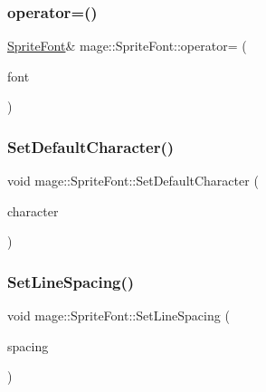 \hypertarget{classmage_1_1_sprite_font_ab00b7f5c2740faf52ea778d94ae704bd}{}\label{classmage_1_1_sprite_font_ab00b7f5c2740faf52ea778d94ae704bd} 
\subsubsection{\texorpdfstring{operator=()}{operator=()}\hspace{0.1cm}{\footnotesize\ttfamily [2/2]}}
{\footnotesize\ttfamily \hyperlink{classmage_1_1_sprite_font}{Sprite\+Font}\& mage\+::\+Sprite\+Font\+::operator= (\begin{DoxyParamCaption}\item[{\hyperlink{classmage_1_1_sprite_font}{Sprite\+Font} \&\&}]{font }\end{DoxyParamCaption})\hspace{0.3cm}{\ttfamily [delete]}}

\hypertarget{classmage_1_1_sprite_font_a0b0feb25673d6f9d9e3215167800d817}{}\label{classmage_1_1_sprite_font_a0b0feb25673d6f9d9e3215167800d817} 
\subsubsection{\texorpdfstring{Set\+Default\+Character()}{SetDefaultCharacter()}}
{\footnotesize\ttfamily void mage\+::\+Sprite\+Font\+::\+Set\+Default\+Character (\begin{DoxyParamCaption}\item[{wchar\+\_\+t}]{character }\end{DoxyParamCaption})}

\hypertarget{classmage_1_1_sprite_font_adc013412c3b59e40c326552b77d9c457}{}\label{classmage_1_1_sprite_font_adc013412c3b59e40c326552b77d9c457} 
\subsubsection{\texorpdfstring{Set\+Line\+Spacing()}{SetLineSpacing()}}
{\footnotesize\ttfamily void mage\+::\+Sprite\+Font\+::\+Set\+Line\+Spacing (\begin{DoxyParamCaption}\item[{float}]{spacing }\end{DoxyParamCaption})}



